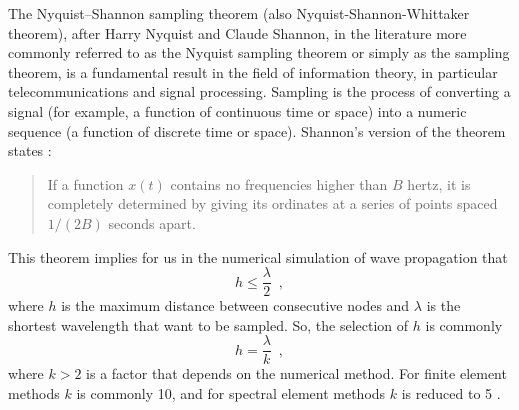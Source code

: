 \documentclass[12pt,letterpaper]{article}
\begin{document}
The Nyquist–Shannon sampling theorem (also Nyquist-Shannon-Whittaker theorem), after Harry Nyquist and Claude Shannon, in the literature more commonly referred to as the Nyquist sampling theorem or simply as the sampling theorem, is a fundamental result in the field of information theory, in particular telecommunications and signal processing. Sampling is the process of converting a signal (for example, a function of continuous time or space) into a numeric
sequence (a function of discrete time or space). Shannon's version of the theorem states \cite{Shannon, Nyquist, wiki:nyquist, Whittaker}:
\begin{quote}
If a function $x(t)$ contains no frequencies higher than $B$ hertz,
it is completely determined by giving its ordinates at a series of
points spaced $1/(2B)$ seconds apart. 
\end{quote}
This theorem implies for us in the numerical simulation of wave propagation
that 
\[
h\leq\frac{\lambda}{2}\enspace,
\]
 where $h$ is the maximum distance between consecutive nodes and
$\lambda$ is the shortest wavelength that want to be sampled. So,
the selection of $h$ is commonly 
\[
h=\frac{\lambda}{k}\enspace,
\]
 where $k>2$ is a factor that depends on the numerical method. For
finite element methods $k$ is commonly 10, and for spectral element
methods $k$ is reduced to 5 \cite{Komatitsch99}.
\end{document}
